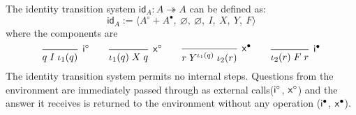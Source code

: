 \documentclass[sigplan,10pt,authordraft]{acmart}
\begin{document}
\begin{definition} \label{def:lts-id}

The identity transition system $\mathsf{id}_A : A \twoheadrightarrow A$ can be
defined as:
\[
  \mathsf{id}_A :=
  \langle A^\circ + A^\bullet,\: \varnothing,\: \varnothing,\: I,\: X,\: Y,\: F \rangle
\]
where the components are
\[
  \begin{prooftree}
    \infer0[$\kw{i}^\circ$]{q \mathrel{I} \iota_1(q)}
  \end{prooftree}
  \qquad
  \begin{prooftree}
    \infer0[$\kw{x}^\circ$]{\iota_1(q) \mathrel{X} q}
  \end{prooftree}
  \qquad
  \begin{prooftree}
    \infer0[$\kw{x}^\bullet$]{r \mathrel{Y^{\iota_1(q)}} \iota_2(r)}
  \end{prooftree}
  \qquad
  \begin{prooftree}
    \infer0[$\kw{i}^\bullet$]{\iota_2(r) \mathrel{F} r}
  \end{prooftree}
\]
The identity transition system permits no internal steps. Questions from the
environment are immediately passed through as external calls($ \mathsf{i} ^\circ$,
$ \mathsf{x} ^\circ$) and the answer it receives is returned to the environment
without any operation ($ \mathsf{i} ^\bullet$, $ \mathsf{x} ^\bullet$).

\end{definition}
\end{document}
